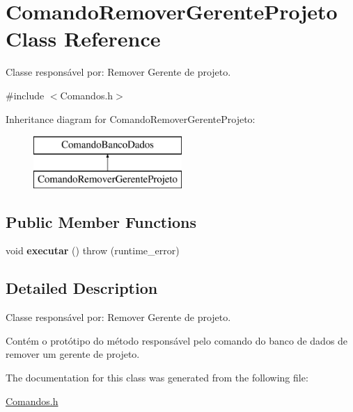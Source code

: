 \hypertarget{class_comando_remover_gerente_projeto}{}\section{Comando\+Remover\+Gerente\+Projeto Class Reference}
\label{class_comando_remover_gerente_projeto}


Classe responsável por\+: Remover Gerente de projeto.  




{\ttfamily \#include $<$Comandos.\+h$>$}

Inheritance diagram for Comando\+Remover\+Gerente\+Projeto\+:\begin{figure}[H]
\begin{center}
\leavevmode
\includegraphics[height=2.000000cm]{class_comando_remover_gerente_projeto}
\end{center}
\end{figure}
\subsection*{Public Member Functions}
\begin{DoxyCompactItemize}
\item 
\hypertarget{class_comando_remover_gerente_projeto_adbced1ae3b1255f1e30793de1560c6ca}{}\label{class_comando_remover_gerente_projeto_adbced1ae3b1255f1e30793de1560c6ca} 
void {\bfseries executar} ()  throw (runtime\+\_\+error)
\end{DoxyCompactItemize}


\subsection{Detailed Description}
Classe responsável por\+: Remover Gerente de projeto. 

Contém o protótipo do método responsável pelo comando do banco de dados de remover um gerente de projeto. 

The documentation for this class was generated from the following file\+:\begin{DoxyCompactItemize}
\item 
\hyperlink{_comandos_8h}{Comandos.\+h}\end{DoxyCompactItemize}
